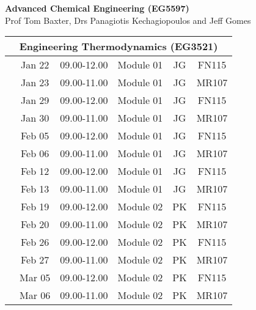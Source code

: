 \documentclass[12pt,oneside,a4paper]{article}
\begin{document}
\setcounter{page}{1}

\begin{center}
{\bf {\Large Advanced Chemical Engineering (EG5597)}}\\
\bigskip
{\large Prof Tom Baxter, Drs Panagiotis Kechagiopoulos and Jeff Gomes}
\end{center}

\bigskip



\begin{center}
\begin{tabular}{||c||c|c|c|c|c||}
\hline\hline
\multicolumn{6}{||c||}{Engineering Thermodynamics (EG3521)} \\
\hline\hline
\multirow{3}{*}{\color{red}{Week 28}} & Jan 22   & 09.00-12.00 & Module 01 & JG  & FN115 \\
                                      & Jan 23   & 09.00-11.00 & Module 01 & JG  & MR107 \\
\hline
\multirow{3}{*}{\color{red}{Week 29}} & Jan 29   & 09.00-12.00 & Module 01 & JG  & FN115 \\
                                      & Jan 30   & 09.00-11.00 & Module 01 & JG  & MR107 \\
\hline
\multirow{3}{*}{\color{red}{Week 30}} & Feb 05   & 09.00-12.00 & Module 01 & JG  & FN115 \\
                                      & Feb 06   & 09.00-11.00 & Module 01 & JG  & MR107 \\
\hline
\multirow{3}{*}{\color{red}{Week 31}} & Feb 12   & 09.00-12.00 & Module 01 & JG  & FN115 \\
                                      & Feb 13   & 09.00-11.00 & Module 01 & JG  & MR107 \\
\hline
\multirow{3}{*}{\color{red}{Week 32}} & Feb 19   & 09.00-12.00 & Module 02 & PK  & FN115 \\
                                      & Feb 20   & 09.00-11.00 & Module 02 & PK  & MR107 \\
\hline
\multirow{3}{*}{\color{red}{Week 33}} & Feb 26   & 09.00-12.00 & Module 02 & PK  & FN115 \\
                                      & Feb 27   & 09.00-11.00 & Module 02 & PK  & MR107 \\
\hline
\multirow{3}{*}{\color{red}{Week 34}} & Mar 05   & 09.00-12.00 & Module 02 & PK  & FN115 \\
                                      & Mar 06   & 09.00-11.00 & Module 02 & PK  & MR107 \\

\end{tabular}
\end{center}
\end{document}
